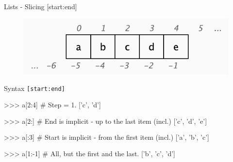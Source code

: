 \documentclass[10pt]{beamer}
\begin{document}
\begin{frame}[fragile]{Lists - Slicing [start:end]}

	\vspace*{-0.1cm}
	\begin{figure}[!h]
		\centering
		\includegraphics[width=0.55\linewidth]{img/slicing.pdf}
	\end{figure}

	\vspace*{-0.3cm}
	\pause
	Syntax \small{\texttt{[start:end]}}

	\pause
	\begin{pythoncode}
		>>> a[2:4]  # Step = 1.
		['c', 'd']
	\end{pythoncode}

	\pause
	\begin{pythoncode}
		>>> a[2:]  # End is implicit - up to the last item (incl.)
		['c', 'd', 'e']
	\end{pythoncode}

	\pause
	\begin{pythoncode}
		>>> a[:3]  # Start is implicit - from the first item (incl.)
		['a', 'b', 'c']
	\end{pythoncode}

	\pause
	\begin{pythoncode}
		>>> a[1:-1]  # All, but the first and the last.
		['b', 'c', 'd']
	\end{pythoncode}
\end{frame}
\end{document}
